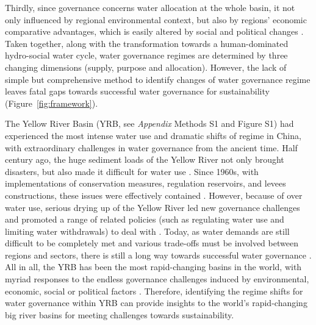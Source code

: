 \documentclass[9pt, twocolumn, twoside, lineno]{pnas-new}
\begin{document}
Thirdly, since governance concerns water allocation at the whole basin, it not only influenced by regional environmental context, but also by regions' economic comparative advantages, which is easily altered by social and political changes
\cite{roobavannan2017,speed2013}.
Taken together, along with the transformation towards a human-dominated hydro-social water cycle, water governance regimes are determined by three changing dimensions (supply, purpose and allocation). However, the lack of simple but comprehensive method to identify changes of water governance regime leaves fatal gaps towards successful water governance for sustainability (Figure~\ref{fig:framework}).

\label{introduction-section-3}
The Yellow River Basin (YRB, see \textit{Appendix} Methods S1 and Figure S1) had experienced the most intense water use and dramatic shifts of regime in China, with extraordinary challenges in water governance from the ancient time.
Half century ago, the huge sediment loads of the Yellow River not only brought disasters, but also made it difficult for water use 
\cite{song2020,li2020}. 
Since 1960s, with implementations of conservation measures, regulation reservoirs, and levees constructions, these issues were effectively contained 
\cite{wang2016,wu2020}.
However, because of over water use, serious drying up of the Yellow River led new governance challenges and promoted a range of related policies (such as regulating water use and limiting water withdrawals) to deal with 
\cite{xia2012}.
Today, as water demands are still difficult to be completely met and various trade-offs must be involved between regions and sectors, there is still a long way towards successful water governance 
\cite{wang2019, wohlfart2016}.
All in all, the YRB has been the most rapid-changing basins in the world, with myriad responses to the endless governance challenges induced by environmental, economic, social or political factors 
\cite{bestAnthropogenicStressesWorld2019}.
Therefore, identifying the regime shifts for water governance within YRB can provide insights to the world's rapid-changing big river basins for meeting challenges towards sustainability.
\end{document}
